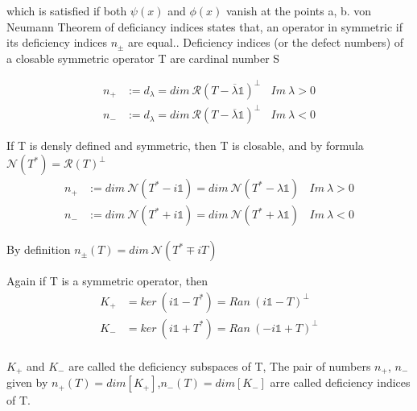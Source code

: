 \documentclass[12pt, letterpaper]{article}
\newcommand*{\1}{\hspace{1pt}}
\begin{document}
        which is satisfied if both $\psi (x)$ and $\phi (x)$ vanish at the points a, b. von Neumann Theorem of deficiancy indices states that, an operator in symmetric if its deficiency
        indices $n_{\pm }$ are equal.\cite{s6}. Deficiency indices (or the defect numbers) of a closable symmetric operator T are cardinal number S

        \begin{equation}
            \begin{split}
                n_{+} &:= d_{\lambda}  = dim \ \mathcal{R} (T-\overline{\lambda}\mathds{1})^{\perp }  \ \ \ \    Im \ \lambda > 0 \\
                n_{-} &:= d_{\lambda}  = dim \ \mathcal{R} (T-\overline{\lambda}\mathds{1})^{\perp }  \ \ \ \    Im \ \lambda < 0 
            \end{split}
        \end{equation}

        If T is densly defined and symmetric, then T is closable, and by formula $\mathcal{N}(T^{*}) = \mathcal{R}(T)^{\perp}$
        \begin{equation}
            \begin{split}
                n_{+} &:= dim \ \mathcal{N} (T^{*}-i\mathds{1})  = dim \ \mathcal{N} (T^{*}-\lambda \mathds{1})  \ \ \ \    Im \ \lambda > 0 \\
                n_{-} &:= dim \ \mathcal{N} (T^{*}+i\mathds{1})  = dim \ \mathcal{N} (T^{*}+\lambda \mathds{1})  \ \ \ \    Im \ \lambda < 0 
            \end{split}
        \end{equation}

        By definition $n_{\pm} (T) = dim \ \mathcal{N}(T^{*} \mp iT )$ 

        Again if T is a symmetric operator, then
        \begin{equation}
            \begin{split}
                K_{+} &= ker \ (i\mathds{1}-T^{*}) = Ran \ (i\mathds{1} - T) ^{\perp} \\
                K_{-} &= ker \ (i \mathds{1} +T^{*}) = Ran \ (-i\mathds{1} + T) ^{\perp} \\ 
            \end{split}
        \end{equation}
        
        $K_{+}$ and $K_{-}$ are called the deficiency subspaces of T, The pair of numbers $n_{+}$, $n_{-}$ given by $n_{+}(T) = dim[K_{+}]$,$n_{-}(T) = dim[K_{-}]$ arre called
        deficiency indices of T.
\end{document}
